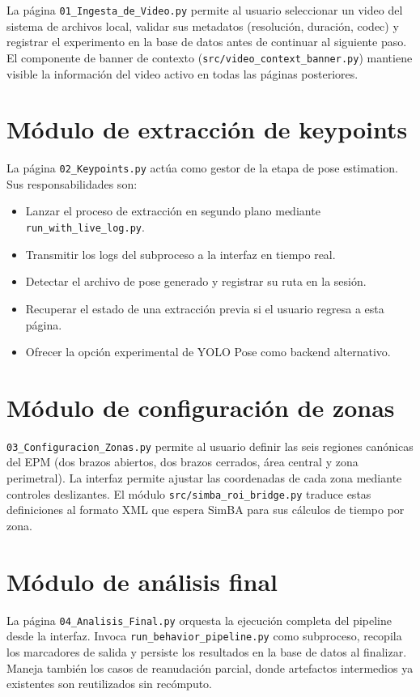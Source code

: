 \documentclass[12pt]{report}
\begin{document}
La página \texttt{01\_Ingesta\_de\_Video.py} permite al usuario seleccionar un
video del sistema de archivos local, validar sus metadatos (resolución, duración,
codec) y registrar el experimento en la base de datos antes de continuar al
siguiente paso. El componente de banner de contexto (\texttt{src/video\_context\_banner.py})
mantiene visible la información del video activo en todas las páginas posteriores.

\section{Módulo de extracción de keypoints}

La página \texttt{02\_Keypoints.py} actúa como gestor de la etapa de pose estimation.
Sus responsabilidades son:

\begin{itemize}[leftmargin=*]
    \item Lanzar el proceso de extracción en segundo plano mediante \texttt{run\_with\_live\_log.py}.
    \item Transmitir los logs del subproceso a la interfaz en tiempo real.
    \item Detectar el archivo de pose generado y registrar su ruta en la sesión.
    \item Recuperar el estado de una extracción previa si el usuario regresa a esta página.
    \item Ofrecer la opción experimental de YOLO Pose como backend alternativo.
\end{itemize}

\section{Módulo de configuración de zonas}

\texttt{03\_Configuracion\_Zonas.py} permite al usuario definir las seis
regiones canónicas del EPM (dos brazos abiertos, dos brazos cerrados, área
central y zona perimetral). La interfaz permite ajustar las coordenadas de
cada zona mediante controles deslizantes. El módulo \texttt{src/simba\_roi\_bridge.py}
traduce estas definiciones al formato XML que espera SimBA para sus cálculos
de tiempo por zona.

\section{Módulo de análisis final}

La página \texttt{04\_Analisis\_Final.py} orquesta la ejecución completa del
pipeline desde la interfaz. Invoca \texttt{run\_behavior\_pipeline.py} como
subproceso, recopila los marcadores de salida y persiste los resultados en la
base de datos al finalizar. Maneja también los casos de reanudación parcial,
donde artefactos intermedios ya existentes son reutilizados sin recómputo.
\end{document}
